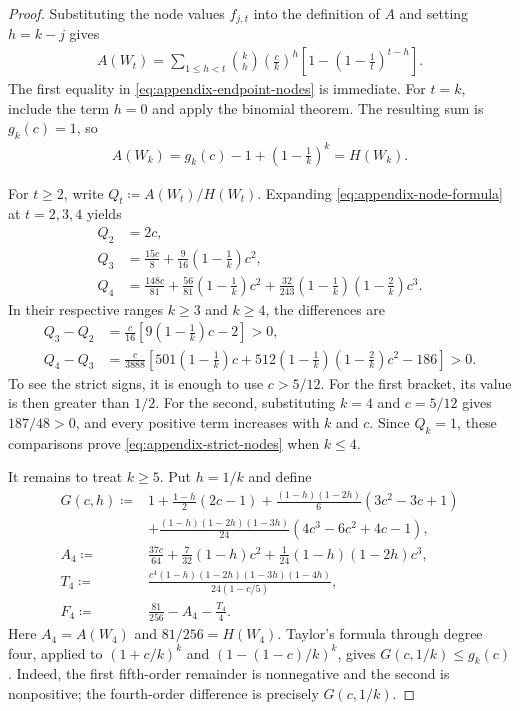 \begin{proof}
Substituting the node values $f_{j,t}$ into the definition of $A$ and setting $h=k-j$ gives
\begin{align}\label{eq:appendix-node-formula}
A(W_t)=\sum_{1\le h<t}\binom{k}{h}\left(\frac ck\right)^h
\left[1-\left(1-\frac1t\right)^{t-h}\right].
\end{align}
The first equality in \cref{eq:appendix-endpoint-nodes} is immediate. For $t=k$, include the term $h=0$ and apply the binomial theorem. The resulting sum is $g_k(c)=1$, so
\begin{align*}
A(W_k)=g_k(c)-1+\left(1-\frac1k\right)^k=H(W_k).
\end{align*}

For $t\ge2$, write $Q_t\coloneqq A(W_t)/H(W_t)$. Expanding \cref{eq:appendix-node-formula} at $t=2,3,4$ yields
\begin{align*}
Q_2&=2c,\\
Q_3&=\frac{15c}{8}+\frac9{16}\left(1-\frac1k\right)c^2,\\
Q_4&=\frac{148c}{81}+\frac{56}{81}\left(1-\frac1k\right)c^2
+\frac{32}{243}\left(1-\frac1k\right)\left(1-\frac2k\right)c^3.
\end{align*}
In their respective ranges $k\ge3$ and $k\ge4$, the differences are
\begin{align*}
Q_3-Q_2&=\frac c{16}\left[9\left(1-\frac1k\right)c-2\right]>0,\\
Q_4-Q_3&=\frac c{3888}\left[501\left(1-\frac1k\right)c
+512\left(1-\frac1k\right)\left(1-\frac2k\right)c^2-186\right]>0.
\end{align*}
To see the strict signs, it is enough to use $c>5/12$. For the first bracket, its value is then greater than $1/2$. For the second, substituting $k=4$ and $c=5/12$ gives $187/48>0$, and every positive term increases with $k$ and $c$. Since $Q_k=1$, these comparisons prove \cref{eq:appendix-strict-nodes} when $k\le4$.

It remains to treat $k\ge5$. Put $h=1/k$ and define
\begin{align*}
G(c,h)\coloneqq{}&1+\frac{1-h}{2}(2c-1)
+\frac{(1-h)(1-2h)}6(3c^2-3c+1)\\
&+\frac{(1-h)(1-2h)(1-3h)}{24}(4c^3-6c^2+4c-1),\\
A_4\coloneqq{}&\frac{37c}{64}+\frac7{32}(1-h)c^2
+\frac1{24}(1-h)(1-2h)c^3,\\
T_4\coloneqq{}&\frac{c^4(1-h)(1-2h)(1-3h)(1-4h)}{24(1-c/5)},\\
F_4\coloneqq{}&\frac{81}{256}-A_4-\frac{T_4}{4}.
\end{align*}
Here $A_4=A(W_4)$ and $81/256=H(W_4)$. Taylor's formula through degree four, applied to $(1+c/k)^k$ and $(1-(1-c)/k)^k$, gives $G(c,1/k)\le g_k(c)$. Indeed, the first fifth-order remainder is nonnegative and the second is nonpositive; the fourth-order difference is precisely $G(c,1/k)$.


\end{proof}
